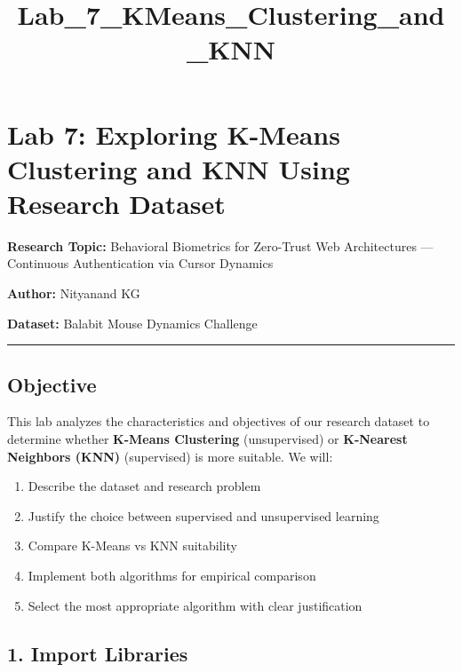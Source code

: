 \documentclass[11pt]{article}
\title{Lab\_7\_KMeans\_Clustering\_and\_KNN}
\providecommand{\tightlist}{%
      \setlength{\itemsep}{0pt}\setlength{\parskip}{0pt}}
\begin{document}
    
    \maketitle
    
    

    
    \section{Lab 7: Exploring K-Means Clustering and KNN Using Research
Dataset}\label{lab-7-exploring-k-means-clustering-and-knn-using-research-dataset}

\textbf{Research Topic:} Behavioral Biometrics for Zero-Trust Web
Architectures --- Continuous Authentication via Cursor Dynamics

\textbf{Author:} Nityanand KG

\textbf{Dataset:} Balabit Mouse Dynamics Challenge

\begin{center}\rule{0.5\linewidth}{0.5pt}\end{center}

\subsection{Objective}\label{objective}

This lab analyzes the characteristics and objectives of our research
dataset to determine whether \textbf{K-Means Clustering} (unsupervised)
or \textbf{K-Nearest Neighbors (KNN)} (supervised) is more suitable. We
will:

\begin{enumerate}
\def\labelenumi{\arabic{enumi}.}
\tightlist
\item
  Describe the dataset and research problem
\item
  Justify the choice between supervised and unsupervised learning
\item
  Compare K-Means vs KNN suitability
\item
  Implement both algorithms for empirical comparison
\item
  Select the most appropriate algorithm with clear justification
\end{enumerate}

    \subsection{1. Import Libraries}\label{import-libraries}
\end{document}
